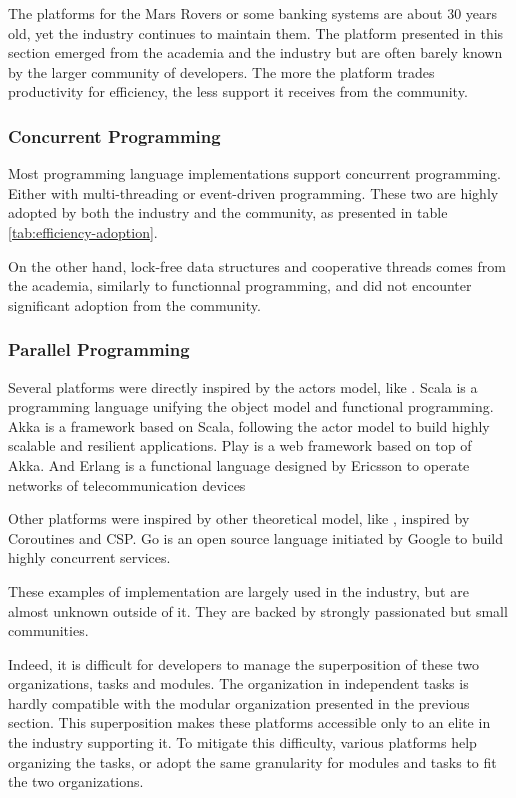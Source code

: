 The platforms for the Mars Rovers or some banking systems are about 30 years old, yet the industry continues to maintain them.
The platform presented in this section emerged from the academia and the industry but are often barely known by the larger community of developers.
The more the platform trades productivity for efficiency, the less support it receives from the community.


\subsubsection{Concurrent Programming}

Most programming language implementations support concurrent programming.
Either with multi-threading or event-driven programming.
These two are highly adopted by both the industry and the community, as presented in table \ref{tab:efficiency-adoption}.

On the other hand, lock-free data structures and cooperative threads comes from the academia, similarly to functionnal programming, and did not encounter significant adoption from the community.

\subsubsection{Parallel Programming}

Several platforms were directly inspired by the actors model, like .
Scala is a programming language unifying the object model and functional programming.
Akka is a framework based on Scala, following the actor model to build highly scalable and resilient applications.
Play is a web framework based on top of Akka.
And Erlang is a functional language designed by Ericsson to operate networks of telecommunication devices \cite{Armstrong1993,Nelson2004,Armstrong2014}

Other platforms were inspired by other theoretical model, like , inspired by Coroutines and CSP.
Go is an open source language initiated by Google to build highly concurrent services.

These examples of implementation are largely used in the industry, but are almost unknown outside of it.
They are backed by strongly passionated but small communities.

Indeed, it is difficult for developers to manage the superposition of these two organizations, tasks and modules.
The organization in independent tasks is hardly compatible with the modular organization presented in the previous section.
This superposition makes these platforms accessible only to an elite in the industry supporting it.
To mitigate this difficulty, various platforms help organizing the tasks, or adopt the same granularity for modules and tasks to fit the two organizations.

